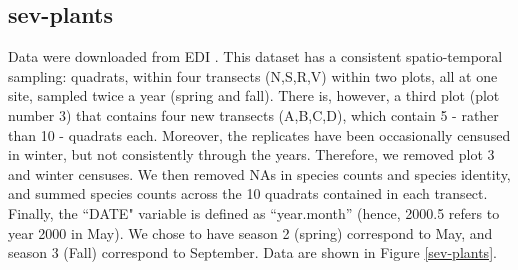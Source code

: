 \documentclass[11pt, oneside]{article}
\begin{document}
\subsection{sev-plants}
Data were downloaded from EDI \citep{sev-plants}.
This dataset has a consistent spatio-temporal sampling: quadrats, within four transects (N,S,R,V) within two plots, all at one site, sampled twice a year (spring and fall). 
There is, however, a third plot (plot number 3) that contains four new transects (A,B,C,D), which contain 5 - rather than 10 - quadrats each. 
Moreover, the replicates have been occasionally censused in winter, but not consistently through the years. 
Therefore, we removed plot 3 and winter censuses.
We then removed NAs in species counts and species identity, and summed species counts across the 10 quadrats contained in each transect. 
Finally, the ``DATE" variable is defined as ``year.month'' (hence, 2000.5 refers to year 2000 in May). 
We chose to have season 2 (spring) correspond to May, and season 3 (Fall) correspond to September.
Data are shown in Figure \ref{sev-plants}.
\end{document}
